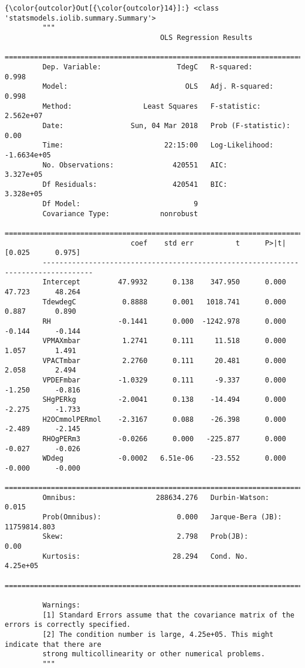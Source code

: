 \documentclass[11pt]{article}
\begin{document}
\begin{Verbatim}[commandchars=\\\{\}]
{\color{outcolor}Out[{\color{outcolor}14}]:} <class 'statsmodels.iolib.summary.Summary'>
         """
                                     OLS Regression Results                            
         ==============================================================================
         Dep. Variable:                  TdegC   R-squared:                       0.998
         Model:                            OLS   Adj. R-squared:                  0.998
         Method:                 Least Squares   F-statistic:                 2.562e+07
         Date:                Sun, 04 Mar 2018   Prob (F-statistic):               0.00
         Time:                        22:15:00   Log-Likelihood:            -1.6634e+05
         No. Observations:              420551   AIC:                         3.327e+05
         Df Residuals:                  420541   BIC:                         3.328e+05
         Df Model:                           9                                         
         Covariance Type:            nonrobust                                         
         ==================================================================================
                              coef    std err          t      P>|t|      [0.025      0.975]
         ----------------------------------------------------------------------------------
         Intercept         47.9932      0.138    347.950      0.000      47.723      48.264
         TdewdegC           0.8888      0.001   1018.741      0.000       0.887       0.890
         RH                -0.1441      0.000  -1242.978      0.000      -0.144      -0.144
         VPMAXmbar          1.2741      0.111     11.518      0.000       1.057       1.491
         VPACTmbar          2.2760      0.111     20.481      0.000       2.058       2.494
         VPDEFmbar         -1.0329      0.111     -9.337      0.000      -1.250      -0.816
         SHgPERkg          -2.0041      0.138    -14.494      0.000      -2.275      -1.733
         H2OCmmolPERmol    -2.3167      0.088    -26.398      0.000      -2.489      -2.145
         RHOgPERm3         -0.0266      0.000   -225.877      0.000      -0.027      -0.026
         WDdeg             -0.0002   6.51e-06    -23.552      0.000      -0.000      -0.000
         ==============================================================================
         Omnibus:                   288634.276   Durbin-Watson:                   0.015
         Prob(Omnibus):                  0.000   Jarque-Bera (JB):         11759814.803
         Skew:                           2.798   Prob(JB):                         0.00
         Kurtosis:                      28.294   Cond. No.                     4.25e+05
         ==============================================================================
         
         Warnings:
         [1] Standard Errors assume that the covariance matrix of the errors is correctly specified.
         [2] The condition number is large, 4.25e+05. This might indicate that there are
         strong multicollinearity or other numerical problems.
         """
\end{Verbatim}
            
\end{document}
